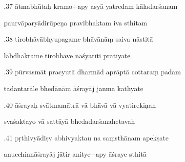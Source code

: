 \documentclass[article,12pt,a4paper]{memoir}%
\newcounter{parCount}
\begin{document}
	  
	  \pstart {}.37 ātmabhūtaḥ kramo+apy asyā yatredaṃ kāladarśanam 
	{}
	\pend%
      

	  
	  \pstart \leavevmode%
	paurvāparyādirūpeṇa pravibhaktam iva sthitam 
	{}
	\pend%
      

	  
	  \pstart {}.38 tirobhāvābhyupagame bhāvānāṃ saiva nāstitā 
	{}
	\pend%
      

	  
	  \pstart \leavevmode%
	labdhakrame tirobhāve naśyatīti pratīyate 
	{}
	\pend%
      

	  
	  \pstart {}.39 pūrvasmāt pracyutā dharmād aprāptā cottaraṃ padam 
	{}
	\pend%
      

	  
	  \pstart \leavevmode%
	tadantarāle bhedānām āśrayāj janma kathyate 
	{}
	\pend%
      

	  
	  \pstart {}.40 āśrayaḥ svātmamātrā vā bhāvā vā vyatirekiṇaḥ 
	{}
	\pend%
      

	  
	  \pstart \leavevmode%
	svaśaktayo vā sattāyā bhedadarśanahetavaḥ 
	{}
	\pend%
      

	  
	  \pstart {}.41 pṛthivyādiṣv abhivyaktau na saṃsthānam apekṣate 
	{}
	\pend%
      

	  
	  \pstart \leavevmode%
	anucchinnāśrayāj jātir anitye+apy āśraye sthitā 
	{}
	\pend%
      
\end{document}
